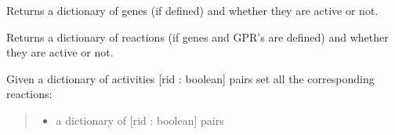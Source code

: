 \documentclass[letterpaper,12pt,english]{sphinxmanual}
\begin{document}
\begin{fulllineitems}
\begin{fulllineitems}
\begin{quote}
\begin{description}
\end{description}\end{quote}

\end{fulllineitems}


\begin{fulllineitems}
\label{\detokenize{api/core:cbmpy.CBModel.Model.getAllGeneActivities}}
\pysigstartsignatures
\pysiglinewithargsret
{}
{}
{}
\pysigstopsignatures
\sphinxAtStartPar
Returns a dictionary of genes (if defined) and whether they are active or
not.

\end{fulllineitems}


\begin{fulllineitems}
\label{\detokenize{api/core:cbmpy.CBModel.Model.getAllProteinActivities}}
\pysigstartsignatures
\pysiglinewithargsret
{}
{}
{}
\pysigstopsignatures
\sphinxAtStartPar
Returns a dictionary of reactions (if genes and GPR’s are defined) and
whether they are active or not.

\end{fulllineitems}


\begin{fulllineitems}
\label{\detokenize{api/core:cbmpy.CBModel.Model.setAllProteinActivities}}
\pysigstartsignatures
\pysiglinewithargsret
{}
{\sphinxparamcomma {}\sphinxparamcomma {}}
{}
\pysigstopsignatures
\sphinxAtStartPar
Given a dictionary of activities {[}rid : boolean{]} pairs set all the corresponding reactions:
\begin{quote}\begin{description}
\begin{itemize}
\item {} 
\sphinxAtStartPar
{} \textendash{} a dictionary of {[}rid : boolean{]} pairs


\end{itemize}
\end{description}
\end{quote}
\end{fulllineitems}
\end{fulllineitems}
\end{document}
